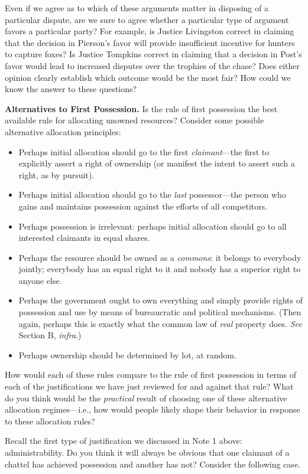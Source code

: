Even if we agree as to which of these arguments matter in disposing of a
particular dispute, are we sure to agree whether a particular type of argument
favors a particular party? For example, is Justice Livingston correct in
claiming that the decision in Pierson's favor will provide insufficient
incentive for hunters to capture foxes? Is Justice Tompkins correct in claiming
that a decision in Post's favor would lead to increased disputes over the
trophies of the chase? Does either opinion clearly establish which outcome would
be the most fair? How could we know the answer to these questions?

\item \textbf{Alternatives to First Possession.} Is the rule of first possession
the best available rule for allocating unowned resources? Consider some possible
alternative allocation principles: 
\begin{itemize}
\item Perhaps initial allocation should go to the first \textit{claimant}---the
first to explicitly assert a right of ownership (or manifest the intent to
assert such a right, as by pursuit).
\item Perhaps initial allocation should go to the \textit{last} possessor---the
person who gains and maintains possession against the efforts of all
competitors. 
\item Perhaps possession is irrelevant: perhaps initial allocation should go to
all interested claimants in equal shares. 
\item Perhaps the resource should be owned as a \textit{commons}: it belongs to
everybody jointly; everybody has an equal right to it and nobody has a superior
right to anyone else.
\item Perhaps the government ought to own everything and simply provide rights
of possession and use by means of bureaucratic and political mechanisms. (Then
again, perhaps this is exactly what the common law of \textit{real} property
does. \textit{See} Section B, \textit{infra}.)
\item Perhaps ownership should be determined by lot, at random. 
\end{itemize}
How would each of these rules compare to the rule of first possession in terms
of each of the justifications we have just reviewed for and against that rule?
What do you think would be the \textit{practical} result of choosing one of
these alternative allocation regimes---i.e., how would people likely shape their
behavior in response to these allocation rules?

\item Recall the first type of justification we discussed in Note 1 above:
administrability. Do you think it will always be obvious that one claimant of a
chattel has achieved possession and another has not? Consider the following
case.

